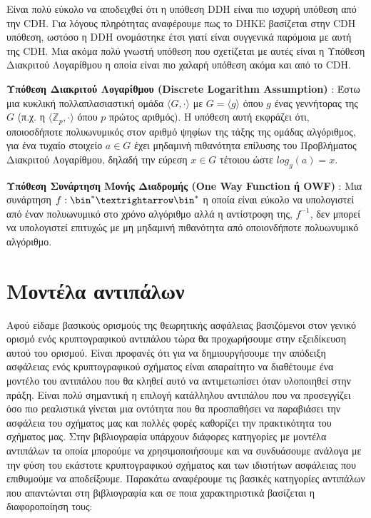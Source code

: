 Είναι πολύ εύκολο να αποδειχθεί ότι η υπόθεση DDH είναι πιο ισχυρή υπόθεση από την CDH. Για λόγους πληρότητας αναφέρουμε πως το DHKE βασίζεται στην CDH υπόθεση, ωστόσο η DDH ονομάστηκε έτσι γιατί είναι συγγενικά παρόμοια με αυτή της CDH. Μια ακόμα πολύ γνωστή υπόθεση που σχετίζεται με αυτές είναι η Υπόθεση Διακριτού Λογαρίθμου η οποία είναι πιο χαλαρή υπόθεση ακόμα και από το CDH. 

\begin{definition}
\textbf{Υπόθεση Διακριτού Λογαρίθμου (Discrete Logarithm Assumption)} : Έστω μια κυκλική πολλαπλασιαστική ομάδα $\langle G, \cdot \rangle$  με $G = \langle g \rangle$ όπου $g$ ένας γεννήτορας της $G$ (π.χ. η $\langle \mathbb{Z}_p, \cdot \rangle$ όπου  $p$ πρώτος αριθμός). Η υπόθεση αυτή εκφράζει ότι, οποιοσδήποτε πολυωνυμικός στον αριθμό ψηφίων της τάξης της ομάδας αλγόριθμος, για ένα τυχαίο στοιχείο $a \in G$ έχει μηδαμινή πιθανότητα επίλυσης του Προβλήματος Διακριτού Λογαρίθμου, δηλαδή την εύρεση $x \in G$ τέτοιου ώστε $log_g(a) = x$.
\end{definition}

\begin{definition}
\textbf{Υπόθεση Συνάρτηση Μονής Διαδρομής (One Way Function ή OWF)} : Μια συνάρτηση  $f : \bin^{*} → \bin^{*}$ η οποία είναι εύκολο να υπολογιστεί από έναν πολυωνυμικό στο χρόνο αλγόριθμο αλλά η αντίστροφη της, $f^{-1}$, δεν μπορεί να υπολογιστεί επιτυχώς με μη μηδαμινή πιθανότητα από οποιονδήποτε πολυωνυμικό αλγόριθμο.
\end{definition}

\section{Μοντέλα αντιπάλων}

Αφού είδαμε βασικούς ορισμούς της θεωρητικής ασφάλειας βασιζόμενοι στον γενικό ορισμό ενός κρυπτογραφικού αντιπάλου τώρα θα προχωρήσουμε στην εξειδίκευση αυτού του ορισμού. Είναι προφανές ότι για να δημιουργήσουμε την απόδειξη ασφάλειας ενός κρυπτογραφικού σχήματος είναι απαραίτητο να διαθέτουμε ένα μοντέλο του αντιπάλου που θα κληθεί αυτό να αντιμετωπίσει όταν υλοποιηθεί στην πράξη. Είναι πολύ σημαντική η επιλογή κατάλληλου αντιπάλου που να προσεγγίζει όσο πιο ρεαλιστικά γίνεται μια οντότητα που θα προσπαθήσει να παραβιάσει την ασφάλεια του σχήματος μας και πολλές φορές καθορίζει την πρακτικότητα του σχήματος μας. Στην βιβλιογραφία υπάρχουν διάφορες κατηγορίες με μοντέλα αντιπάλων τα οποία μπορούμε να χρησιμοποιήσουμε και να συνδυάσουμε ανάλογα με την φύση του εκάστοτε κρυπτογραφικού σχήματος και των ιδιοτήτων ασφάλειας που επιθυμούμε να αποδείξουμε. Παρακάτω αναφέρουμε τις βασικές κατηγορίες αντιπάλων που απαντώνται στη βιβλιογραφία και σε ποια χαρακτηριστικά βασίζεται η διαφοροποίηση τους:

